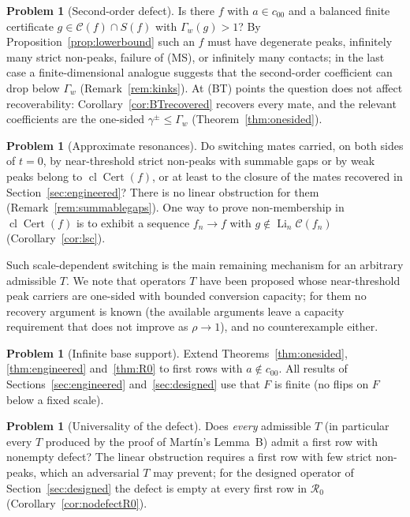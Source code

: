 \documentclass[10pt]{amsart}
\theoremstyle{definition}
\newtheorem{problem}[theorem]{Problem}
\theoremstyle{remark}
\newcommand{\Cset}{\mathcal C}
\newcommand{\Cert}{\operatorname{Cert}}
\newcommand{\Li}{\operatorname*{Li}}
\newcommand{\cl}{\operatorname{cl}}
\begin{document}
\begin{problem}[Second-order defect]\label{prob:secondorder}
Is there $f$ with $a\in c_{00}$ and a balanced finite certificate
$g\in\Cset(f)\cap S(f)$ with $\Gamma_w(g)>1$?  By
Proposition~\ref{prop:lowerbound} such an $f$ must have degenerate peaks,
infinitely many strict non-peaks, failure of (MS), or infinitely many
contacts; in the last case a finite-dimensional analogue suggests that the
second-order coefficient can drop below $\Gamma_w$ (Remark~\ref{rem:kinks}).
At \textup{(BT)} points the question does not affect recoverability:
Corollary~\ref{cor:BTrecovered} recovers every mate, and the relevant
coefficients are the one-sided $\gamma^\pm\le\Gamma_w$
(Theorem~\ref{thm:onesided}).
\end{problem}

\begin{problem}[Approximate resonances]\label{prob:approx}
Do switching mates carried, on both sides of $t=0$, by near-threshold
strict non-peaks with summable gaps or by weak peaks belong to
$\cl\Cert(f)$, or at least to the closure of the mates recovered in
Section~\ref{sec:engineered}?  There is no linear obstruction for them
(Remark~\ref{rem:summablegaps}).  One way to prove non-membership in
$\cl\Cert(f)$ is to exhibit a sequence $f_n\to f$ with
$g\notin\Li_n\Cset(f_n)$ (Corollary~\ref{cor:lsc}).
\end{problem}

Such scale-dependent switching is the main remaining mechanism for an
arbitrary admissible $T$.  We note that operators $T$ have been proposed whose
near-threshold peak carriers are one-sided with bounded conversion capacity;
for them no recovery argument is known (the available arguments leave a
capacity requirement that does not improve as $\rho\to1$), and no
counterexample either.

\begin{problem}[Infinite base support]\label{prob:infiniteF}
Extend Theorems~\ref{thm:onesided}, \ref{thm:engineered} and~\ref{thm:R0}
to first rows with $a\notin c_{00}$.  All results of
Sections~\ref{sec:engineered} and~\ref{sec:designed} use that $F$ is finite
(no flips on $F$ below a fixed scale).
\end{problem}

\begin{problem}[Universality of the defect]\label{prob:universal}
Does \emph{every} admissible $T$ (in particular every $T$ produced by the
proof of Mart\'in's Lemma~B) admit a first row with nonempty defect?  The
linear obstruction requires a first row with few strict non-peaks, which an
adversarial $T$ may prevent; for the designed operator of
Section~\ref{sec:designed} the defect is empty at every first row in
$\mathcal R_0$ (Corollary~\ref{cor:nodefectR0}).
\end{problem}
\end{document}

